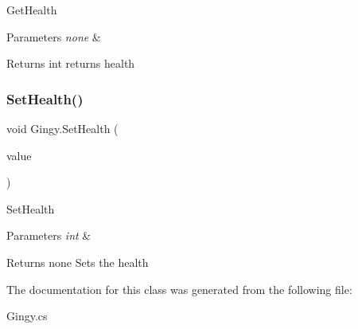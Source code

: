 Get\+Health 
\begin{DoxyParams}{Parameters}
{\em none} & \\
\hline
\end{DoxyParams}
\begin{DoxyReturn}{Returns}
int returns health 
\end{DoxyReturn}
\mbox{\label{class_gingy_a47954df8d4b796088a54e147be4b789d}} 
\subsubsection{\texorpdfstring{Set\+Health()}{SetHealth()}}
{\footnotesize\ttfamily void Gingy.\+Set\+Health (\begin{DoxyParamCaption}\item[{int}]{value }\end{DoxyParamCaption})\hspace{0.3cm}{\ttfamily [inline]}}

Set\+Health 
\begin{DoxyParams}{Parameters}
{\em int} & \\
\hline
\end{DoxyParams}
\begin{DoxyReturn}{Returns}
none Sets the health 
\end{DoxyReturn}


The documentation for this class was generated from the following file\+:\begin{DoxyCompactItemize}
\item 
Gingy.\+cs\end{DoxyCompactItemize}
